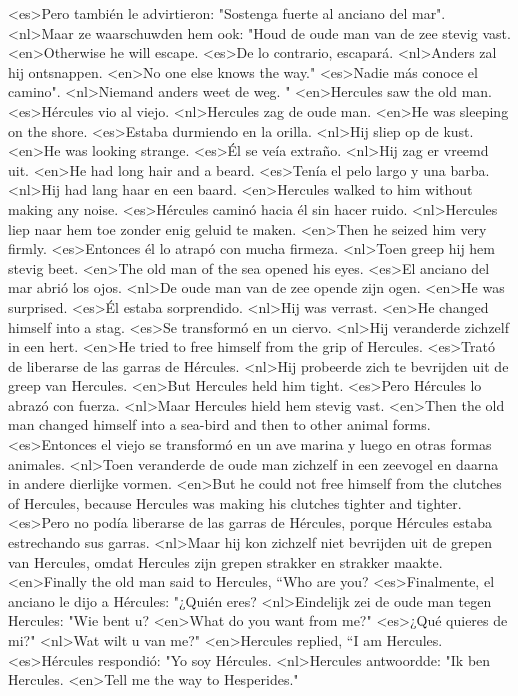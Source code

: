 <es>Pero también le advirtieron: "Sostenga fuerte al anciano del mar".
<nl>Maar ze waarschuwden hem ook: "Houd de oude man van de zee stevig vast.
<en>Otherwise he will escape.
<es>De lo contrario, escapará.
<nl>Anders zal hij ontsnappen.
<en>No one else knows the way."
<es>Nadie más conoce el camino".
<nl>Niemand anders weet de weg. "
<en>Hercules saw the old man.
<es>Hércules vio al viejo.
<nl>Hercules zag de oude man.
<en>He was sleeping on the shore.
<es>Estaba durmiendo en la orilla.
<nl>Hij sliep op de kust.
<en>He was looking strange.
<es>Él se veía extraño.
<nl>Hij zag er vreemd uit.
<en>He had long hair and a beard.
<es>Tenía el pelo largo y una barba.
<nl>Hij had lang haar en een baard.
<en>Hercules walked to him without making any noise.
<es>Hércules caminó hacia él sin hacer ruido.
<nl>Hercules liep naar hem toe zonder enig geluid te maken.
<en>Then he seized him very firmly.
<es>Entonces él lo atrapó con mucha firmeza.
<nl>Toen greep hij hem stevig beet.
<en>The old man of the sea opened his eyes.
<es>El anciano del mar abrió los ojos.
<nl>De oude man van de zee opende zijn ogen.
<en>He was surprised.
<es>Él estaba sorprendido.
<nl>Hij was verrast.
<en>He changed himself into a stag.
<es>Se transformó en un ciervo.
<nl>Hij veranderde zichzelf in een hert.
<en>He tried to free himself from the grip of Hercules.
<es>Trató de liberarse de las garras de Hércules.
<nl>Hij probeerde zich te bevrijden uit de greep van Hercules.
<en>But Hercules held him tight.
<es>Pero Hércules lo abrazó con fuerza.
<nl>Maar Hercules hield hem stevig vast.
<en>Then the old man changed himself into a sea-bird and then to other animal forms.
<es>Entonces el viejo se transformó en un ave marina y luego en otras formas animales.
<nl>Toen veranderde de oude man zichzelf in een zeevogel en daarna in andere dierlijke vormen.
<en>But he could not free himself from the clutches of Hercules, because Hercules was making his clutches tighter and tighter.
<es>Pero no podía liberarse de las garras de Hércules, porque Hércules estaba estrechando sus garras.
<nl>Maar hij kon zichzelf niet bevrijden uit de grepen van Hercules, omdat Hercules zijn grepen strakker en strakker maakte.
<en>Finally the old man said to Hercules, “Who are you?
<es>Finalmente, el anciano le dijo a Hércules: "¿Quién eres?
<nl>Eindelijk zei de oude man tegen Hercules: "Wie bent u?
<en>What do you want from me?"
<es>¿Qué quieres de mi?"
<nl>Wat wilt u van me?"
<en>Hercules replied, “I am Hercules.
<es>Hércules respondió: "Yo soy Hércules.
<nl>Hercules antwoordde: "Ik ben Hercules.
<en>Tell me the way to Hesperides."
